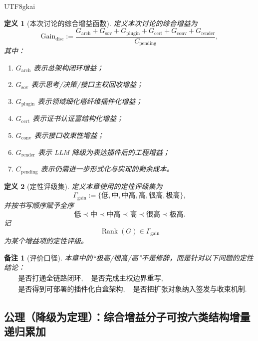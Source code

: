 \documentclass[12pt]{article}
\newtheorem{definition}{定义}[section]
\newtheorem{remark}{备注}[section]
\begin{document}
\begin{CJK*}{UTF8}{gkai}
\begin{definition}[本次讨论的综合增益函数]
\label{def:tex37-ch10-gain}
定义本次讨论的综合增益为
\[
  \mathrm{Gain}_{\mathrm{disc}}
  :=
  \frac{
    G_{\mathrm{arch}}
    +
    G_{\mathrm{sov}}
    +
    G_{\mathrm{plugin}}
    +
    G_{\mathrm{cert}}
    +
    G_{\mathrm{conv}}
    +
    G_{\mathrm{render}}
  }{
    C_{\mathrm{pending}}
  },
\]
其中：
\begin{enumerate}
  \item $G_{\mathrm{arch}}$ 表示总架构闭环增益；
  \item $G_{\mathrm{sov}}$ 表示思考/决策/接口主权回收增益；
  \item $G_{\mathrm{plugin}}$ 表示领域细化塔纤维插件化增益；
  \item $G_{\mathrm{cert}}$ 表示证书认证富结构化增益；
  \item $G_{\mathrm{conv}}$ 表示接口收束性增益；
  \item $G_{\mathrm{render}}$ 表示 LLM 降级为表达插件后的工程增益；
  \item $C_{\mathrm{pending}}$ 表示仍需进一步形式化与实现的剩余成本。
\end{enumerate}
\end{definition}

\begin{definition}[定性评级集]
\label{def:tex37-ch10-rank}
定义本章使用的定性评级集为
\[
  \Gamma_{\mathrm{gain}}
  :=
  \{
    \text{低},
    \text{中},
    \text{中高},
    \text{高},
    \text{很高},
    \text{极高}
  \},
\]
并按书写顺序赋予全序
\[
  \text{低}
  \prec
  \text{中}
  \prec
  \text{中高}
  \prec
  \text{高}
  \prec
  \text{很高}
  \prec
  \text{极高}.
\]
记
\[
  \operatorname{Rank}(G)\in \Gamma_{\mathrm{gain}}
\]
为某个增益项的定性评级。
\end{definition}

\begin{remark}[评价口径]
本章中的“极高/很高/高”不是修辞，而是针对以下问题的定性结论：
\[
  \begin{aligned}
    &\text{是否打通全链路闭环},
    \quad
    \text{是否完成主权边界重写},\\
    &\text{是否得到可部署的插件化白盒架构},
    \quad
    \text{是否把扩张对象纳入签发与收束机制}.
  \end{aligned}
\]
\end{remark}

\subsection{公理（降级为定理）：综合增益分子可按六类结构增量递归累加}
\label{subsec:tex37-ch10-axiom}


\end{CJK*}
\end{document}
